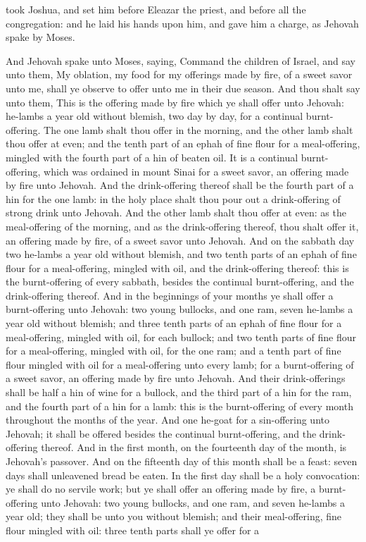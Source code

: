 took Joshua, and set him before Eleazar the priest, and before all the congregation: and he laid his hands upon him, and gave him a charge, as Jehovah spake by Moses. 

And Jehovah spake unto Moses, saying, Command the children of Israel, and say unto them, My oblation, my food for my offerings made by fire, of a sweet savor unto me, shall ye observe to offer unto me in their due season. And thou shalt say unto them, This is the offering made by fire which ye shall offer unto Jehovah: he-lambs a year old without blemish, two day by day, for a continual burnt-offering. The one lamb shalt thou offer in the morning, and the other lamb shalt thou offer at even; and the tenth part of an ephah of fine flour for a meal-offering, mingled with the fourth part of a hin of beaten oil. It is a continual burnt-offering, which was ordained in mount Sinai for a sweet savor, an offering made by fire unto Jehovah. And the drink-offering thereof shall be the fourth part of a hin for the one lamb: in the holy place shalt thou pour out a drink-offering of strong drink unto Jehovah. And the other lamb shalt thou offer at even: as the meal-offering of the morning, and as the drink-offering thereof, thou shalt offer it, an offering made by fire, of a sweet savor unto Jehovah.  And on the sabbath day two he-lambs a year old without blemish, and two tenth parts of an ephah of fine flour for a meal-offering, mingled with oil, and the drink-offering thereof: this is the burnt-offering of every sabbath, besides the continual burnt-offering, and the drink-offering thereof.  And in the beginnings of your months ye shall offer a burnt-offering unto Jehovah: two young bullocks, and one ram, seven he-lambs a year old without blemish; and three tenth parts of an ephah of fine flour for a meal-offering, mingled with oil, for each bullock; and two tenth parts of fine flour for a meal-offering, mingled with oil, for the one ram; and a tenth part of fine flour mingled with oil for a meal-offering unto every lamb; for a burnt-offering of a sweet savor, an offering made by fire unto Jehovah. And their drink-offerings shall be half a hin of wine for a bullock, and the third part of a hin for the ram, and the fourth part of a hin for a lamb: this is the burnt-offering of every month throughout the months of the year. And one he-goat for a sin-offering unto Jehovah; it shall be offered besides the continual burnt-offering, and the drink-offering thereof.  And in the first month, on the fourteenth day of the month, is Jehovah’s passover. And on the fifteenth day of this month shall be a feast: seven days shall unleavened bread be eaten. In the first day shall be a holy convocation: ye shall do no servile work; but ye shall offer an offering made by fire, a burnt-offering unto Jehovah: two young bullocks, and one ram, and seven he-lambs a year old; they shall be unto you without blemish; and their meal-offering, fine flour mingled with oil: three tenth parts shall ye offer for a 